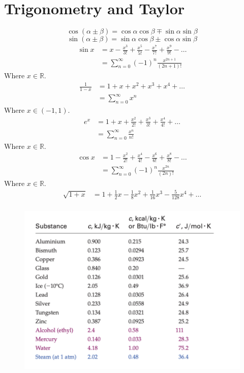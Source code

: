 \documentclass[12pt,a4paper]{article}
\begin{document}
	\section*{Trigonometry and Taylor}
\begin{equation*}
	\cos(\alpha \pm \beta) = \cos \alpha \cos \beta \mp \sin \alpha \sin \beta
\end{equation*}
\begin{equation*}
	\sin(\alpha \pm \beta) = \sin \alpha \cos \beta \pm \cos \alpha \sin \beta
\end{equation*}
\begin{align*}
	\sin x &= x - \frac{x^3}{3!} + \frac{x^5}{5!} - \frac{x^7}{7!} + \frac{x^9}{9!} - \dotso \\
	&= \sum_{n=0}^\infty (-1)^n \frac{x^{2n + 1}}{(2n + 1)!}
\end{align*}
Where \(x \in \mathbb{R}\).
\begin{align*}
	\frac{1}{1-x} &= 1 + x + x^2 + x^3 + x^4 + \dotso \\
	&= \sum_{n=0}^\infty x^n
\end{align*}
Where \(x \in (-1,1)\).
\begin{align*}
	e^x &= 1 + x + \frac{x^2}{2!} + \frac{x^3}{3!} + \frac{x^4}{4!} + \dotso \\
	&= \sum_{n=0}^\infty \frac{x^n}{n!}
\end{align*}
Where \(x \in \mathbb{R}\).
\begin{align*}
	\cos x &= 1 - \frac{x^2}{2!} + \frac{x^4}{4!} - \frac{x^6}{6!} + \frac{x^8}{8!} - \dotso \\
	&= \sum_{n=0}^\infty (-1)^n \frac{x^{2n}}{(2n)!}
\end{align*}
Where \(x \in \mathbb{R}\).
\begin{align*}
	\sqrt{1 + x} &= 1 + \frac{1}{2}x - \frac{1}{8}x^2 + \frac{1}{16}x^3 - \frac{5}{128}x^4 + \dots \\
\end{align*}


	\begin{figure}[h!]
	\centering
	\includegraphics[width=0.7\linewidth]{latentHeat1}
	\caption{}
	\label{fig:latentheat2}
\end{figure}
\end{document}
